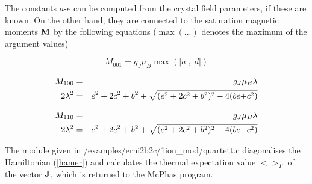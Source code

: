 The constants $a$-$e$ can be computed from the crystal field parameters, if
these are known. On the other hand, they are connected to the saturation
magnetic moments $\mathbf M$ by the following equations ($\max(...)$ denotes the
maximum of the argument values)

\begin{equation}
M_{001}=g_J \mu_B \max(|a|,|d|) 
\end{equation}

\begin{eqnarray}
M_{100}&=&g_J \mu_B \lambda\\
2\lambda^2&=&e^2+2c^2+b^2 + \sqrt{(e^2+2c^2+b^2)^2-4(be{\mathbf +}c^2)}
\end{eqnarray}

\begin{eqnarray}
M_{110}&=&g_J \mu_B  \lambda\\
2\lambda^2&=&e^2+2c^2+b^2 + \sqrt{(e^2+2c^2+b^2)^2-4(be{\mathbf -}c^2)}
\end{eqnarray}

The module given in {\prg /examples/erni2b2c/1ion\_mod/quartett.c} diagonalises
the Hamiltonian (\ref{hamer}) and calculates the thermal expectation 
value $<>_T$ of the vector $\mathbf J$, which
is returned to the {\prg McPhas} program.
